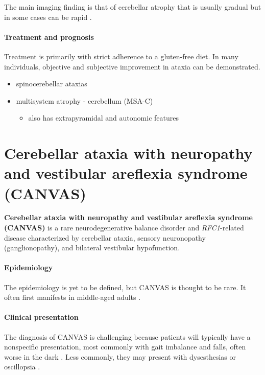 The main imaging finding is that of cerebellar atrophy that is usually gradual but in some cases can be rapid .

\paragraph{Treatment and prognosis}

Treatment is primarily with strict adherence to a gluten-free diet. In many individuals, objective and subjective improvement in ataxia can be demonstrated.

\begin{tcolorbox}[colback=green!5!white,colframe=green!75!white,title=Differential diagnosis]
\begin{itemize}
	\tightlist
	\item
	spinocerebellar ataxias
	\item
	multisystem atrophy - cerebellum (MSA-C)
	
	\begin{itemize}
		\tightlist
		\item
		also has extrapyramidal and autonomic features 
	\end{itemize}
\end{itemize}
\end{tcolorbox}

\section{Cerebellar ataxia with neuropathy and vestibular areflexia syndrome (CANVAS)}

\textbf{Cerebellar ataxia with neuropathy and vestibular areflexia syndrome (CANVAS)} is a rare neurodegenerative balance disorder and \emph{RFC1}-related disease characterized by cerebellar ataxia, sensory neuronopathy (ganglionopathy), and bilateral vestibular hypofunction.

\paragraph{Epidemiology}

The epidemiology is yet to be defined, but CANVAS is thought to be rare. It often first manifests in middle-aged adults .

\paragraph{Clinical presentation}

The diagnosis of CANVAS is challenging because patients will typically have a nonspecific presentation, most commonly with gait imbalance and falls, often worse in the dark . Less commonly, they may present with dysesthesias or oscillopsia .

